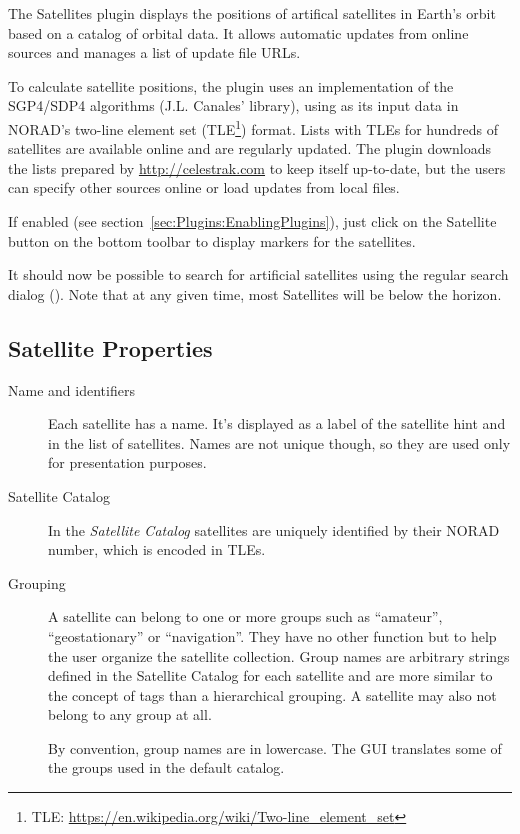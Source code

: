 
\noindent The Satellites plugin displays the positions of artifical satellites
in Earth's orbit based on a catalog of orbital data. It allows
automatic updates from online sources and manages a list of update
file URLs.

To calculate satellite positions, the plugin uses an implementation of
the SGP4/SDP4 algorithms (J.L. Canales'  library), using
as its input data in NORAD's two-line element set
(TLE\footnote{TLE: \url{https://en.wikipedia.org/wiki/Two-line_element_set}})
format. Lists with TLEs for hundreds of satellites are available
online and are regularly updated. The plugin downloads the lists
prepared by \url{http://celestrak.com} to keep itself up-to-date, but the users can
specify other sources online or load updates from local files.

If enabled (see
section~\ref{sec:Plugins:EnablingPlugins}), just click on the
Satellite button   on the bottom
toolbar to display markers for the satellites.

It should now be possible to search for artificial satellites using
the regular search dialog (). Note that at any given time, most
Satellites will be below the horizon.

\subsection{Satellite Properties}
\label{sec:plugins:Satellites:properties}

\begin{description}
\item[Name and identifiers] Each satellite has a name. It's displayed as a label of the satellite hint and in the list of satellites. Names are not unique though, so they are used only
for presentation purposes.

\item[Satellite Catalog] In the \emph{Satellite Catalog} satellites are uniquely identified by their NORAD number, which is encoded in TLEs.

\item[Grouping]
A satellite can belong to one or more groups such as ``amateur'',
``geostationary'' or ``navigation''. They have no other function but
to help the user organize the satellite collection.  Group names are
arbitrary strings defined in the Satellite Catalog for each satellite
and are more similar to the concept of tags than a hierarchical
grouping. A satellite may also not belong to any group at all.

By convention, group names are in lowercase. The GUI translates some of the groups used in the default catalog.
\end{description}

